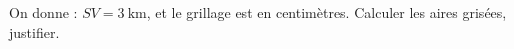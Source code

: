 
\begin{exercice}\label{exo2smath-0322}

    On donne : \( SV=\SI{3}{\kilo\meter}\), et le grillage est en centimètres. Calculer les aires grisées, justifier.

    \begin{multicols}{2}

        \begin{center}
   
        \end{center}

\columnbreak

\begin{center}
   
\end{center}

    \end{multicols}
\end{exercice}
